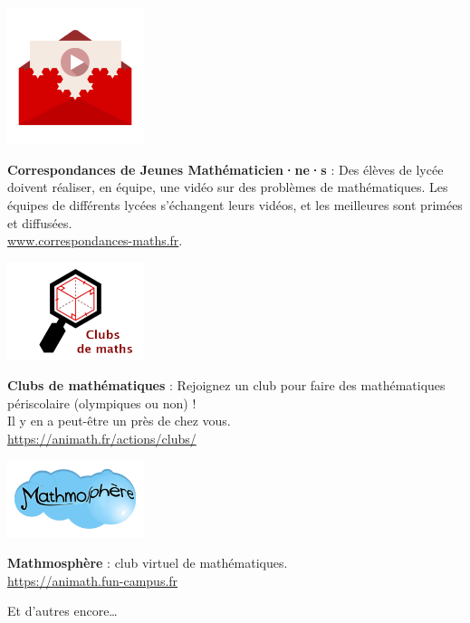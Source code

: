 \begin{minipage}[c]{.46\linewidth}
\includegraphics[width=40mm]{01-Intro/logos/correspondances.png}
\end{minipage}
\begin{minipage}[c]{.46\linewidth}	
\textbf{Correspondances de Jeunes Mathématicien·ne·s} :
Des élèves de lycée doivent réaliser, en équipe, une vidéo sur des problèmes de mathématiques. Les équipes de différents lycées s'échangent leurs vidéos, et les meilleures sont primées et diffusées.
\\ \url{www.correspondances-maths.fr}.
\end{minipage} \hfill


\vspace{4mm}



\begin{minipage}[c]{.46\linewidth}
\includegraphics[width=40mm]{01-Intro/logos/clubs_de_maths.png}
\end{minipage}
\begin{minipage}[c]{.46\linewidth}	
\textbf{Clubs de mathématiques} :
Rejoignez un club pour faire des mathématiques périscolaire (olympiques ou non) ! \\ Il y en a peut-être un près de chez vous.
\\
\url{https://animath.fr/actions/clubs/}

\end{minipage} \hfill

		
	
\vspace{4mm}



\begin{minipage}[c]{.46\linewidth}
\includegraphics[width=40mm]{01-Intro/logos/mathmosphere.png}
\end{minipage}
\begin{minipage}[c]{.46\linewidth}	
\textbf{Mathmosphère} : club virtuel de mathématiques.
\\
\url{https://animath.fun-campus.fr}

\end{minipage} \hfill
\vspace{16mm}

Et d'autres encore\ldots

\vfill
		
	
\pagebreak
